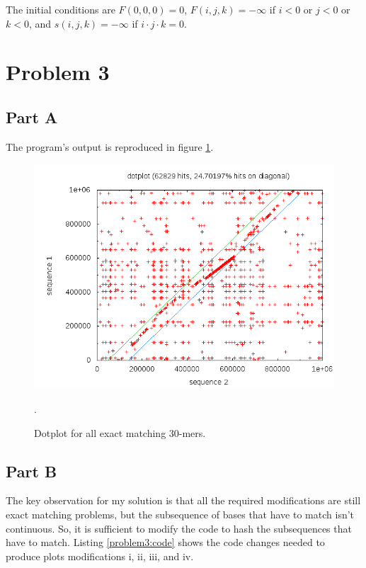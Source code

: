 The initial conditions are $F(0, 0, 0) = 0$, $F(i, j, k) = -\infty$ if $i <
0$ or $j < 0$ or $k < 0$, and $s(i, j, k) = -\infty$ if $i \cdot j \cdot k = 0$.

\section{Problem 3}

\subsection{Part A}

The program's output is reproduced in figure \ref{problem3:exact30}.

\begin{figure}[htb]
  \includegraphics[width=6.8in]{6.878/ps1/figs/p3_exact30.png}
  \caption{Dotplot for all exact matching 30-mers.}
  \label{problem3:exact30}.
\end{figure}

\subsection{Part B}

The key observation for my solution is that all the required modifications are
still exact matching problems, but the subsequence of bases that have to match
isn't continuous. So, it is sufficient to modify the code to hash the
subsequences that have to match. Listing \ref{problem3:code} shows the
code changes needed to produce plots modifications i, ii, iii, and iv.

